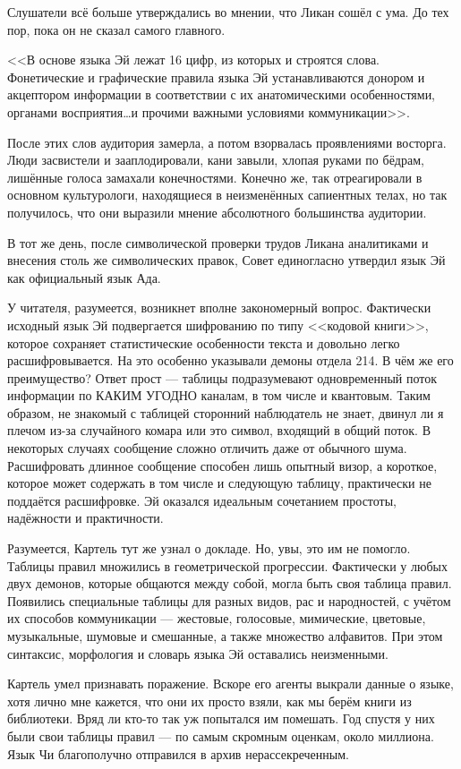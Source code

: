 \documentclass[a4paper,10pt]{book}
\begin{document}
Слушатели всё больше утверждались во мнении, что Ликан сошёл с ума. До тех пор, 
пока он не сказал самого главного.

<<В основе языка Эй лежат 16 цифр, из которых и строятся слова. Фонетические и 
графические правила языка Эй устанавливаются донором и акцептором информации в 
соответствии с их анатомическими особенностями, органами восприятия\ldots и 
прочими важными условиями коммуникации>>.

После этих слов аудитория замерла, а потом взорвалась проявлениями восторга. 
Люди засвистели и зааплодировали, кани завыли, хлопая руками по бёдрам, 
лишённые голоса замахали конечностями. Конечно же, так отреагировали в основном 
культурологи, находящиеся в неизменённых сапиентных телах, но так получилось, 
что они выразили мнение абсолютного большинства аудитории.

В тот же день, после символической проверки трудов Ликана аналитиками и 
внесения столь же символических правок, Совет единогласно утвердил язык Эй как 
официальный язык Ада.

У читателя, разумеется, возникнет вполне закономерный вопрос. Фактически 
исходный язык Эй подвергается
шифрованию по типу <<кодовой книги>>, которое сохраняет статистические 
особенности текста и довольно легко расшифровывается. На это особенно указывали 
демоны отдела 214. В чём же его преимущество? Ответ прост --- таблицы 
подразумевают одновременный поток 
информации по КАКИМ УГОДНО каналам, в том числе и квантовым. Таким образом, не 
знакомый с таблицей сторонний наблюдатель не знает, двинул ли я плечом из-за 
случайного комара или это символ, входящий в общий поток. В некоторых случаях 
сообщение сложно отличить даже от обычного шума. Расшифровать длинное сообщение 
способен лишь опытный визор, а короткое, которое может содержать в том числе и 
следующую таблицу, практически не поддаётся расшифровке.  Эй оказался идеальным 
сочетанием простоты, надёжности и практичности.

Разумеется, Картель тут же узнал о докладе. Но, увы, это им не помогло. Таблицы 
правил множились в геометрической прогрессии. Фактически у любых двух демонов, 
которые общаются между собой, могла быть своя таблица правил. Появились 
специальные таблицы для разных видов, рас и народностей, с учётом их способов 
коммуникации --- жестовые, голосовые, мимические, цветовые, музыкальные, 
шумовые и смешанные, а также множество алфавитов. При этом синтаксис, 
морфология и словарь языка Эй оставались неизменными.

Картель умел признавать поражение. Вскоре его агенты выкрали данные о языке, 
хотя лично мне кажется, что они их просто взяли, как мы берём книги из 
библиотеки. Вряд ли кто-то так уж попытался им помешать. Год спустя у них были 
свои таблицы правил --- по самым скромным оценкам, около миллиона. Язык Чи 
благополучно отправился в архив нерассекреченным.
\end{document}
